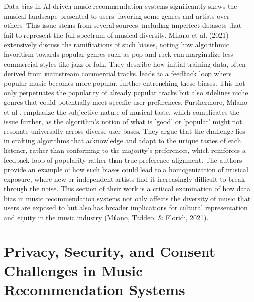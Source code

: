\documentclass[10pt,twocolumn]{article}
\begin{document}
Data bias in AI-driven music recommendation systems significantly skews the musical landscape presented to users, favoring some genres and artists over others. This issue stems from several sources, including imperfect datasets that fail to represent the full spectrum of musical diversity. Milano et al. (2021) \cite{milano2021ethical} extensively discuss the ramifications of such biases, noting how algorithmic favoritism towards popular genres such as pop and rock can marginalize less commercial styles like jazz or folk. They describe how initial training data, often derived from mainstream commercial tracks, leads to a feedback loop where popular music becomes more popular, further entrenching these biases. This not only perpetuates the popularity of already popular tracks but also sidelines niche genres that could potentially meet specific user preferences. Furthermore, Milano et al \cite{milano2021ethical}. emphasize the subjective nature of musical taste, which complicates the issue further, as the algorithm’s notion of what is 'good' or 'popular' might not resonate universally across diverse user bases. They argue that the challenge lies in crafting algorithms that acknowledge and adapt to the unique tastes of each listener, rather than conforming to the majority's preferences, which reinforces a feedback loop of popularity rather than true preference alignment. The authors provide an example of how such biases could lead to a homogenization of musical exposure, where new or independent artists find it increasingly difficult to break through the noise. This section of their work is a critical examination of how data bias in music recommendation systems not only affects the diversity of music that users are exposed to but also has broader implications for cultural representation and equity in the music industry (Milano, Taddeo, & Floridi, 2021)\cite{milano2021ethical}.


\section{Privacy, Security, and Consent Challenges in Music Recommendation Systems}
\end{document}
